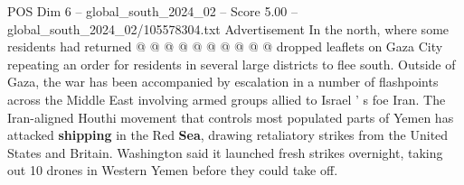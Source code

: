 \begin{textsample}{POS Dim 6 – global\_south\_2024\_02 – Score 5.00 – global\_south\_2024\_02/105578304.txt}
Advertisement In the north, where some residents had returned @ @ @ @ @ @ @ @ @ @ dropped leaflets on Gaza City repeating an order for residents in several large districts to flee south.
Outside of Gaza, the war has been accompanied by escalation in a number of flashpoints across the Middle East involving armed groups allied to Israel ' s foe Iran.
The Iran-aligned Houthi movement that controls most populated parts of Yemen has attacked \textbf{shipping} in the Red \textbf{Sea}, drawing retaliatory strikes from the United States and Britain.
Washington said it launched fresh strikes overnight, taking out 10 drones in Western Yemen before they could take off.

\end{textsample}
